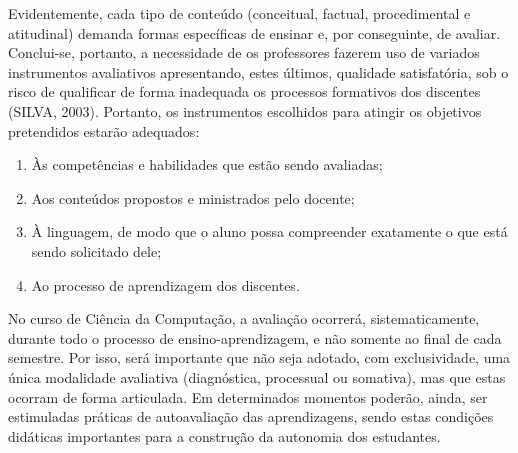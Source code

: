 \documentclass[
	12pt,				%
	openright,			%
  oneside,     %
	a4paper,			%
	chapter=TITLE,		%
	english,			%
	french,				%
	spanish,			%
	brazil				%
	]{abntex2}
\begin{document}
Evidentemente, cada tipo de conteúdo (conceitual, factual, procedimental e atitudinal) demanda formas específicas de ensinar e, por conseguinte, de avaliar. Conclui-se, portanto, a necessidade de os professores fazerem uso de variados instrumentos avaliativos apresentando, estes últimos, qualidade satisfatória, sob o risco de qualificar de forma inadequada os processos formativos dos discentes (SILVA, 2003). Portanto, os instrumentos escolhidos para atingir os objetivos pretendidos estarão adequados:

\begin{enumerate}[label=(\alph*)]
    \item Às competências e habilidades que estão sendo avaliadas;
    \item Aos conteúdos propostos e ministrados pelo docente; 
    \item À linguagem, de modo que o aluno possa compreender exatamente o que está sendo solicitado dele; 
    \item Ao processo de aprendizagem dos discentes.     
\end{enumerate}

No curso de Ciência da Computação, a avaliação ocorrerá, sistematicamente, durante todo o processo de ensino-aprendizagem, e não somente ao final de cada semestre. Por isso, será importante que não seja adotado, com exclusividade, uma única modalidade avaliativa (diagnóstica, processual ou somativa), mas que estas ocorram de forma articulada. Em determinados momentos poderão, ainda, ser estimuladas práticas de autoavaliação das aprendizagens, sendo estas condições didáticas importantes para a construção da autonomia dos estudantes.
\end{document}
